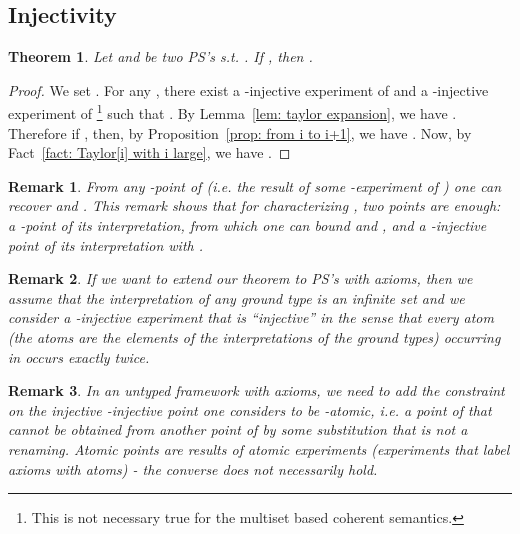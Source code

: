\documentclass{article}
\theoremstyle{plain}
\newtheorem{theorem}{Theorem}
\newtheorem{rem}{Remark}
\begin{document}
\subsection{Injectivity}

\begin{theorem}\label{thm: injectivity}
Let  and  be two PS's s.t. . If , then .
\end{theorem}

\begin{proof}
We set  . 
For any , there exist a -injective experiment  of  and a -injective experiment  of \footnote{This is not necessary true for the multiset based coherent semantics.} such that . By Lemma~\ref{lem: taylor expansion}, we have . Therefore if , then, by Proposition~\ref{prop: from i to i+1}, we have . Now, by Fact~\ref{fact: Taylor[i] with i large}, we have .
\end{proof}

\begin{rem}
From any -point of  (i.e. the result of some -experiment of ) one can recover  and . This remark shows that for characterizing , two points are enough: a -point of its interpretation, from which one can bound  and , and a -injective point of its interpretation with .
\end{rem}

\begin{rem}\label{remark: with axioms}
If we want to extend our theorem to PS's with axioms, then we assume that the interpretation of any ground type is an infinite set and we consider a -injective experiment  that is ``injective'' in the sense that every atom (the atoms are the elements of the interpretations of the ground types) occurring in  occurs exactly twice.
\end{rem}

\begin{rem}\label{remark: untyped framework}
In an untyped framework with axioms, we need to add the constraint on the injective -injective point one considers to be {-atomic}, i.e. a point of  that cannot be obtained from another point of  by some substitution that is not a renaming. Atomic points are results of atomic experiments (experiments that label axioms with atoms) - the converse does not necessarily hold.
\end{rem}



\onecolumn

\appendix
\end{document}
